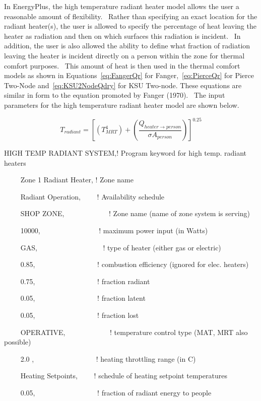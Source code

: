 In EnergyPlus, the high temperature radiant heater model allows the user a reasonable amount of flexibility.~ Rather than specifying an exact location for the radiant heater(s), the user is allowed to specify the percentage of heat leaving the heater as radiation and then on which surfaces this radiation is incident.~ In addition, the user is also allowed the ability to define what fraction of radiation leaving the heater is incident directly on a person within the zone for thermal comfort purposes.~ This amount of heat is then used in the thermal comfort models as shown in Equations~\ref{eq:FangerQr} for Fanger,~\ref{eq:PierceQr} for Pierce Two-Node and~\ref{eq:KSU2NodeQdry} for KSU Two-node. These equations are similar in form to the equation promoted by Fanger (1970).~ The input parameters for the high temperature radiant heater model are shown below.

\begin{equation}
{T_{radiant}} = {\left[ {\left( {T_{MRT}^4} \right) + \left( {\frac{{{Q_{heater \to person}}}}{{\sigma {A_{person}}}}} \right)} \right]^{0.25}}
\label{eq:HighTempRadSysTradiant}
\end{equation}

HIGH TEMP RADIANT SYSTEM,! Program keyword for high temp. radiant heaters

~~~~ Zone 1 Radiant Heater, ! Zone name

~~~~ Radiant Operation,~~~~ ! Availability schedule

~~~~ SHOP ZONE,~~~~~~~~~~~~ ! Zone name (name of zone system is serving)

~~~~ 10000,~~~~~~~~~~~~~~~~ ! maximum power input (in Watts)

~~~~ GAS,~~~~~~~~~~~~~~~~~~ ! type of heater (either gas or electric)

~~~~ 0.85,~~~~~~~~~~~~~~~~~ ! combustion efficiency (ignored for elec. heaters)

~~~~ 0.75,~~~~~~~~~~~ ~~~~~~! fraction radiant

~~~~ 0.05,~~~~~~~~~~~~~~~~~ ! fraction latent

~~~~ 0.05,~~~~~~~~~~~~~~~~~ ! fraction lost

~~~~ OPERATIVE,~~~~~~~~~~~~ ! temperature control type (MAT, MRT also possible)

~~~~ 2.0 ,~~~~~~~~~~~~~~~~~ ! heating throttling range (in C)

~~~~ Heating Setpoints,~~~~ ! schedule of heating setpoint temperatures

~~~~ 0.05,~~~~~~~~~~~~~~~~~ ! fraction of radiant energy to people

